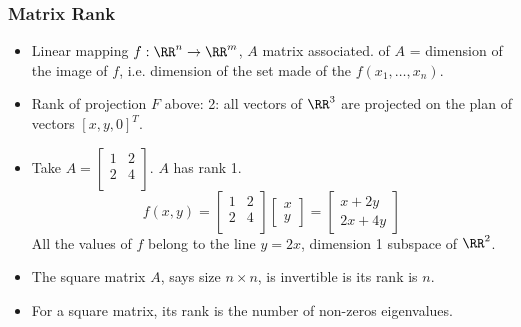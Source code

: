 \documentclass[8pt]{beamer}
\newcommand{\myemph}[1]{{\color{blue}{#1}}}
\begin{document}
\begin{frame}
  \frametitle{Matrix Rank}
  \begin{itemize}
  \item Linear mapping $f:\RR^n \to \RR^m$, $A$ matrix associated. \myemph{Rank} of $A$ = dimension of the image of $f$, i.e. dimension of the 
    set made of the $f(x_1,\dots,x_n)$.
  \item Rank of projection $F$ above: 2: all vectors of $\RR^3$ are projected on the plan of vectors $[x,y,0]^T$.
  \item Take $A =
    \begin{bmatrix}
      1 & 2\\
      2 & 4\\
    \end{bmatrix}
    $. $A$ has rank 1. 
    $$
    f(x,y) =  \begin{bmatrix}
      1 & 2\\
      2 & 4\\
    \end{bmatrix}
    \begin{bmatrix}
      x\\y
    \end{bmatrix}
    =
    \begin{bmatrix}
      x + 2y\\
      2x + 4y
    \end{bmatrix}
    $$
    All the values of $f$ belong to the line $y = 2x$, dimension 1 subspace of $\RR^2$.
  \item The square matrix $A$, says size $n\times n$, is invertible is its rank is $n$.
  \item For a square matrix, its rank is the number of non-zeros eigenvalues.
  \end{itemize}
\end{frame}
\end{document}

